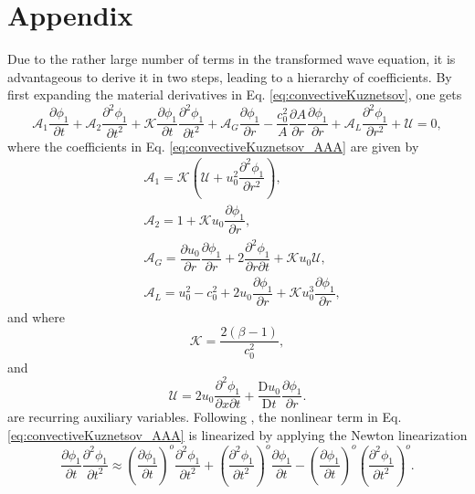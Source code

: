 \chapter{Appendix}
\label{chap:Appendix}

Due to the rather large number of terms in the transformed wave equation, it is advantageous to derive it in two steps, leading to a hierarchy of coefficients. By first expanding the material derivatives in Eq. \eqref{eq:convectiveKuznetsov}, one gets
\begin{equation}
\mathcal{A}_1 \dfrac{\partial \phi_1}{\partial t}
+ \mathcal{A}_2 \dfrac{\partial^2 \phi_1}{\partial t^2}
+ \mathcal{K} \dfrac{\partial \phi_1}{\partial t}\dfrac{\partial^2 \phi_1}{\partial t^2}
+ \mathcal{A}_G \dfrac{\partial \phi_1}{\partial r} - \dfrac{c_0^2}{A}\dfrac{\partial A}{\partial r} \dfrac{\partial \phi_1}{\partial r} + \mathcal{A}_L \dfrac{\partial^2 \phi_1}{\partial r^2}
+ \mathcal{U} = 0,
\label{eq:convectiveKuznetsov_AAA}
\end{equation}
where the coefficients in Eq. \eqref{eq:convectiveKuznetsov_AAA} are given by
\begin{align}
& \mathcal{A}_1 = \mathcal{K}\left(\mathcal{U} + u_0^2\dfrac{\partial^2\phi_1}{\partial r^2}\right),
\label{eq:A1} \\
& \mathcal{A}_2 = 1 + \mathcal{K}u_0\dfrac{\partial \phi_1}{\partial r},
\label{eq:A2} \\
& \mathcal{A}_G = \dfrac{\partial u_0}{\partial r}\dfrac{\partial \phi_1}{\partial r} + 2\dfrac{\partial^2 \phi_1}{\partial r\partial t} + \mathcal{K}u_0 \mathcal{U},
\label{eq:AG} \\
& \mathcal{A}_L = u_0^2 - c_0^2 + 2u_0\dfrac{\partial \phi_1}{\partial r} + \mathcal{K}u_0^3\dfrac{\partial \phi_1}{\partial r},
\label{eq:AL}
\end{align}
and where
\begin{equation}
\mathcal{K} = \dfrac{2\left(\beta - 1\right)}{c_0^2},
\label{eq:Kcoeff}
\end{equation}
and
\begin{equation}
\mathcal{U} = 2u_0\dfrac{\partial^2 \phi_1}{\partial x\partial t} + \dfrac{\mathrm{D}u_0}{\mathrm{D}t}\dfrac{\partial\phi_1}{\partial r}.
\label{eq:Uterm}
\end{equation}
are recurring auxiliary variables. Following \citet{Solovchuk_et_al_2013}, the nonlinear term in Eq. \eqref{eq:convectiveKuznetsov_AAA} is linearized by applying the Newton linearization
\begin{equation}
\dfrac{\partial \phi_1}{\partial t}\dfrac{\partial^2 \phi_1}{\partial t^2} \approx
\left(\dfrac{\partial \phi_1}{\partial t}\right)^o\dfrac{\partial^2 \phi_1}{\partial t^2}
+
\left(\dfrac{\partial^2 \phi_1}{\partial t^2}\right)^o\dfrac{\partial \phi_1}{\partial t}
- \left(\dfrac{\partial \phi_1}{\partial t}\right)^o\left(\dfrac{\partial^2 \phi_1}{\partial t^2}\right)^o.
\label{eq:NewtonLin}
\end{equation}

